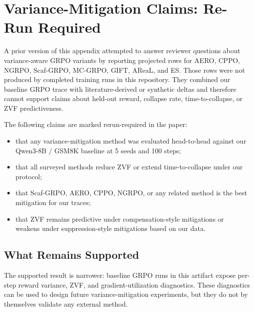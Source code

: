 %

\section{Variance-Mitigation Claims: Re-Run Required}
\label{app:variance-mitigation}

A prior version of this appendix attempted to answer reviewer questions about
variance-aware GRPO variants by reporting projected rows for AERO, CPPO,
NGRPO, Scaf-GRPO, MC-GRPO, GIFT, AReaL, and ES. Those rows were not produced by
completed training runs in this repository. They combined our baseline GRPO
trace with literature-derived or synthetic deltas and therefore cannot support
claims about held-out reward, collapse rate, time-to-collapse, or ZVF
predictiveness.

The following claims are marked rerun-required in the paper:
\begin{itemize}
  \item that any variance-mitigation method was evaluated head-to-head against
  our Qwen3-8B / GSM8K baseline at 5 seeds and 100 steps;
  \item that all surveyed methods reduce ZVF or extend time-to-collapse under
  our protocol;
  \item that Scaf-GRPO, AERO, CPPO, NGRPO, or any related method is the best
  mitigation for our traces;
  \item that ZVF remains predictive under compensation-style mitigations or
  weakens under suppression-style mitigations based on our data.
\end{itemize}

\subsection{What Remains Supported}
\label{sec:variance-survey}

The supported result is narrower: baseline GRPO runs in this artifact expose
per-step reward variance, ZVF, and gradient-utilization diagnostics. These
diagnostics can be used to design future variance-mitigation experiments, but
they do not by themselves validate any external method.

